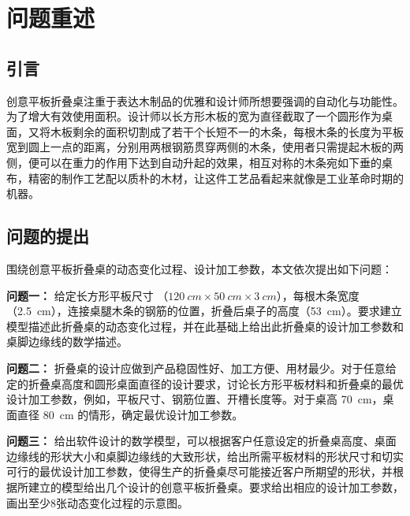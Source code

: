 \section{问题重述}

\subsection{引言}   %

创意平板折叠桌注重于表达木制品的优雅和设计师所想要强调的自动化与功能性。为了增大有效使用面积。设计师以长方形木板的宽为直径截取了一个圆形作为桌面，又将木板剩余的面积切割成了若干个长短不一的木条，每根木条的长度为平板宽到圆上一点的距离，分别用两根钢筋贯穿两侧的木条，使用者只需提起木板的两侧，便可以在重力的作用下达到自动升起的效果，相互对称的木条宛如下垂的桌布，精密的制作工艺配以质朴的木材，让这件工艺品看起来就像是工业革命时期的机器。


\subsection{问题的提出}


\noindent 围绕创意平板折叠桌的动态变化过程、设计加工参数，本文依次提出如下问题：

\textbf{问题一：} 给定长方形平板尺寸 （$\SI{120}{cm} \times \SI{50}{cm} \times \SI{3}{cm}$），每根木条宽度（\SI{2.5}{cm}），连接桌腿木条的钢筋的位置，折叠后桌子的高度（\SI{53}{cm}）。要求建立模型描述此折叠桌的动态变化过程，并在此基础上给出此折叠桌的设计加工参数和桌脚边缘线的数学描述。


\textbf{问题二：} 折叠桌的设计应做到产品稳固性好、加工方便、用材最少。对于任意给定的折叠桌高度和圆形桌面直径的设计要求，讨论长方形平板材料和折叠桌的最优设计加工参数，例如，平板尺寸、钢筋位置、开槽长度等。对于桌高 \SI{70}{cm}，桌面直径 \SI{80}{cm} 的情形，确定最优设计加工参数。


\textbf{问题三：} 给出软件设计的数学模型，可以根据客户任意设定的折叠桌高度、桌面边缘线的形状大小和桌脚边缘线的大致形状，给出所需平板材料的形状尺寸和切实可行的最优设计加工参数，使得生产的折叠桌尽可能接近客户所期望的形状，并根据所建立的模型给出几个设计的创意平板折叠桌。要求给出相应的设计加工参数，画出至少8张动态变化过程的示意图。
